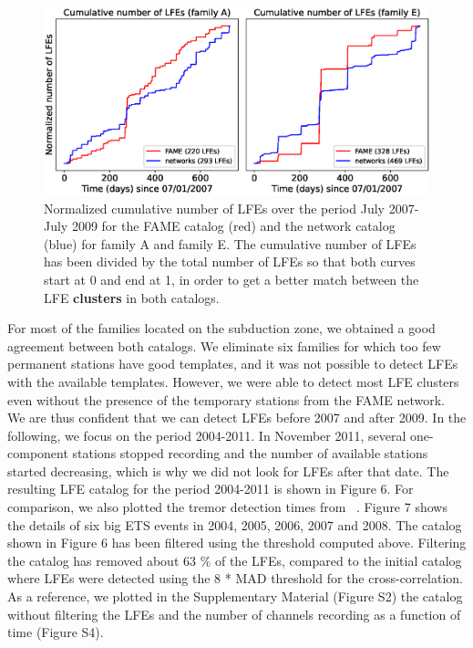 \documentclass[draft]{agujournal2019}
\begin{document}
\begin{figure}
\noindent\includegraphics[width=\textwidth, trim={0cm 0cm 0cm 0cm},clip]{figures/cumulative.eps}
\caption{Normalized cumulative number of LFEs over the period July 2007-July 2009 for the FAME catalog (red) and the network catalog (blue) for family A and family E. The cumulative number of LFEs has been divided by the total number of LFEs so that both curves start at 0 and end at 1, in order to get a better match between the LFE \textbf{clusters} in both catalogs.}
\label{pngfiguresample}
\end{figure}

For most of the families located on the subduction zone, we obtained a good agreement between both catalogs. We eliminate six families for which too few permanent stations have good templates, and it was not possible to detect LFEs with the available templates. However, we were able to detect most LFE clusters even without the presence of the temporary stations from the FAME network. We are thus confident that we can detect LFEs before 2007 and after 2009. In the following, we focus on the period 2004-2011. In November 2011, several one-component stations stopped recording and the number of available stations started decreasing, which is why we did not look for LFEs after that date. The resulting LFE catalog for the period 2004-2011 is shown in Figure 6. For comparison, we also plotted the tremor detection times from ~. Figure 7 shows the details of six big ETS events in 2004, 2005, 2006, 2007 and 2008. The catalog shown in Figure 6 has been filtered using the threshold computed above. Filtering the catalog has removed about 63 \% of the LFEs, compared to the initial catalog where LFEs were detected using the 8 * MAD threshold for the cross-correlation. As a reference, we plotted in the Supplementary Material (Figure S2) the catalog without filtering the LFEs and the number of channels recording as a function of time (Figure S4). \\
\end{document}
